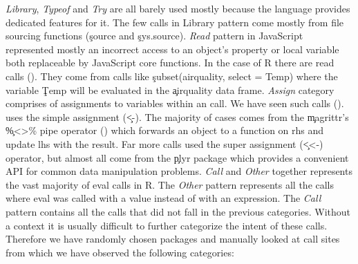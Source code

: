 \documentclass[conference]{IEEEtran}
\begin{document}
\noindent \emph{Library}, \emph{Typeof} and \emph{Try} are all barely used
mostly because the language provides dedicated features for it. The few calls in
Library pattern come mostly from file sourcing functions (\ie \c{source} and \c{sys.source}).
%
\noindent \emph{Read} pattern in JavaScript represented mostly an incorrect
access to an object's property or local variable both replaceable by JavaScript
core functions. In the case of R there are \PatternReadRnd read \eval calls
(\PatternReadRatio). They come from calls like \c{subset(airquality, select =
  Temp)} where the variable \c{Temp} will be evaluated in the \c{airquality}
data frame.
%
\noindent \emph{Assign} category comprises of assignments to variables within
an \eval call. We have seen \PatternAssignRnd such calls (\PatternAssignRatio).
\PatternAssignArrowRatio uses the simple assignment (\c{<-}). The majority of
cases comes from the \c{magrittr}'s \c{\%<>\%} pipe operator
(\PatternAssignArrowMagrittrRatio) which forwards an object to a function on rhs
and update lhs with the result. Far more calls used the super assignment
(\c{<<-}) operator, but almost all come from the \c{plyr} package which provides
a convenient API for common data manipulation problems.
%
\noindent \emph{Call} and \emph{Other} together represents the vast majority of
eval calls in R. The \emph{Other} pattern represents all the calls where eval
was called with a value instead of with an expression. The \emph{Call} pattern
contains all the calls that did not fall in the previous categories. Without a
context it is usually difficult to further categorize the intent of these calls.
Therefore we have randomly chosen \PatternManualPackages packages and manually
looked at \PatternManualCallsites call sites from which we have observed the following categories:

\end{document}
